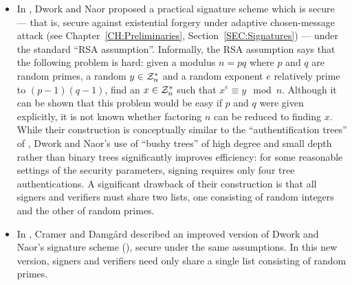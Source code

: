 \begin{itemize}

\item In \cite{dwork:fastsigs}, Dwork and Naor proposed a practical signature
scheme which is secure --- that is, secure against existential forgery under
adaptive chosen-message attack (see Chapter~\ref{CH:Preliminaries},
Section~\ref{SEC:Signatures}) --- under the standard ``RSA assumption''.
Informally, the RSA assumption says that the following problem is
hard: given a modulus $n = pq$ where $p$ and $q$
are random primes, a random $y \in \mathcal{Z}_n^*$ and a random exponent $e$  
relatively prime to $(p-1)(q-1)$, find an $x \in \mathcal{Z}_n^*$ such that $x^e
\equiv y \mod n$. Although it can be shown that this problem would be easy if
$p$ and $q$ were given explicitly, 
it is not known whether factoring $n$ can be reduced to finding $x$. While their
construction is conceptually similar to the ``authentification trees'' of
\cite{goldwasser:signatures2}, Dwork and Naor's use of ``bushy trees'' of high
degree and small depth rather than binary trees significantly improves
efficiency: for some reasonable settings of the security parameters, signing
requires only four tree authentications.  A significant drawback of their
construction is that all signers and verifiers must share two lists, one
consisting of random integers and the other of random primes.

\item In \cite{cramer:fastsigs}, Cramer and Damg\aa rd described an improved
version of Dwork and Naor's signature scheme (\cite{dwork:fastsigs}), secure
under the same assumptions. In this new version, signers and verifiers need
only share a single list consisting of random primes. 


\end{itemize}
